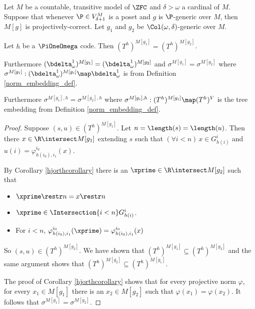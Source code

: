 \documentclass[oneside,12pt]{amsart}
\begin{document}
\begin{lemma}
\label{applyhjorthcorollary}
Let $M$ be a countable, transitive model of $\ZFC$ and  $\delta>\omega$ a cardinal of $M$.
Suppose that whenever $\P\in V^M_{\delta+1}$ is a poset and $g$ is $\P$-generic over $M$, then
$M[g]$ is projectively-correct. Let $g_1$ and $g_2$ be $\Col(\omega, \delta)$-generic over $M$.

Let $h$ be a $\PiOneOmega$ code. Then $(T^h)^{M[g_1]}=(T^h)^{M[g_2]}$.

Furthermore $(\bdelta^1_{\omega})^{M[g_1]}=(\bdelta^1_{\omega})^{M[g_2]}$ and
$\sigma^{M[g_1]}=\sigma^{M[g_2]}$ where
$\sigma^{M[g_i]}:(\bdelta^1_{\omega})^{M[g_i]}\map \bdelta^1_{\omega}$ is from
Definition \ref{norm_embedding_def}.

Furthermore $\sigma^{M[g_1],h} = \sigma^{M[g_2],h}$ where
$\sigma^{M[g_i],h}:(T^h)^{M[g_i]}\map(T^h)^V$ is the tree embedding from
Definition \ref{norm_embedding_def}.
\end{lemma}
\begin{proof}
Suppose $(s,u)\in (T^h)^{M[g_1]}$. Let $n=\length(s)=\length(u)$. Then there
$x\in\R\intersect M[g_1]$ extending $s$ such that $(\forall i<n)\, x\in G^{i}_{h(i)}$ and
$u(i)=\varphi^{i_0}_{h(i_0),i_1}(x)$.

By Corollary \ref{hjorthcorollary} there is an $\xprime\in\R\intersect M[g_2]$ such that
\begin{itemize}
\item $\xprime \restr n = x \restr n$
\item $\xprime\in \Intersection{i<n} G^i_{h(i)}$.
\item For $i<n$, $\varphi^{i_0}_{h(i_0),i_1}(\xprime) = \varphi^{i_0}_{h(i_0),i_1}(x)$
\end{itemize}

So $(s,u)\in (T^h)^{M[g_2]}$. We have shown that $(T^h)^{M[g_1]}\subseteq(T^h)^{M[g_2]}$
and the same argument shows that
$(T^h)^{M[g_2]}\subseteq(T^h)^{M[g_1]}$.

The proof of Corollary \ref{hjorthcorollary} shows that for every projective norm
$\varphi$, for every $x_1\in M[g_1]$ there is an $x_2\in M[g_2]$ such that
$\varphi(x_1)=\varphi(x_2)$. It follows that $\sigma^{M[g_1]} = \sigma^{M[g_2]}$.

\end{proof}
\end{document}
